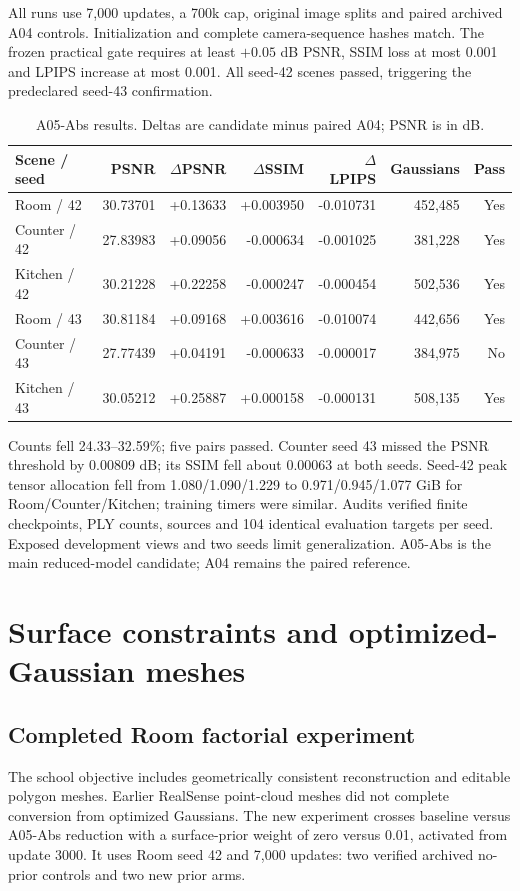 \documentclass[11pt,a4paper]{article}
\begin{document}
All runs use 7,000 updates, a 700k cap, original image splits and paired
archived A04 controls. Initialization and complete camera-sequence hashes
match. The frozen practical gate requires at least $+0.05$ dB PSNR, SSIM
loss at most 0.001 and LPIPS increase at most 0.001. All seed-42 scenes
passed, triggering the predeclared seed-43 confirmation.

\begin{table}[!ht]
\centering\small
\begin{tabularx}{\linewidth}{@{}Yrrrrrr@{}}
\toprule
\textbf{Scene / seed} & \textbf{PSNR} & \textbf{$\Delta$PSNR} & \textbf{$\Delta$SSIM} & \textbf{$\Delta$LPIPS} & \textbf{Gaussians} & \textbf{Pass} \\
\midrule
Room / 42 & 30.73701 & +0.13633 & +0.003950 & -0.010731 & 452,485 & Yes \\
Counter / 42 & 27.83983 & +0.09056 & -0.000634 & -0.001025 & 381,228 & Yes \\
Kitchen / 42 & 30.21228 & +0.22258 & -0.000247 & -0.000454 & 502,536 & Yes \\
Room / 43 & 30.81184 & +0.09168 & +0.003616 & -0.010074 & 442,656 & Yes \\
Counter / 43 & 27.77439 & +0.04191 & -0.000633 & -0.000017 & 384,975 & No \\
Kitchen / 43 & 30.05212 & +0.25887 & +0.000158 & -0.000131 & 508,135 & Yes \\
\bottomrule
\end{tabularx}
\caption{A05-Abs results. Deltas are candidate minus paired A04; PSNR is in dB.}
\label{tab:a05}
\end{table}

Counts fell 24.33--32.59\%; five pairs passed. Counter seed 43 missed the
PSNR threshold by 0.00809 dB; its SSIM fell about 0.00063 at both seeds.
Seed-42 peak tensor allocation fell from
1.080/1.090/1.229 to 0.971/0.945/1.077 GiB for Room/Counter/Kitchen;
training timers were similar. Audits verified finite checkpoints, PLY counts,
sources and 104 identical evaluation targets per seed. Exposed development
views and two seeds limit generalization. A05-Abs is the main reduced-model
candidate; A04 remains the paired reference.

\clearpage
\section{Surface constraints and optimized-Gaussian meshes}
\label{sec:surface}
\subsection{Completed Room factorial experiment}
The school objective includes geometrically consistent reconstruction and
editable polygon meshes. Earlier RealSense point-cloud meshes did not
complete conversion from optimized Gaussians. The new experiment crosses
baseline versus A05-Abs reduction with a surface-prior weight of zero versus
0.01, activated from update 3000. It uses Room seed 42 and 7,000 updates:
two verified archived no-prior controls and two new prior arms.
\end{document}
